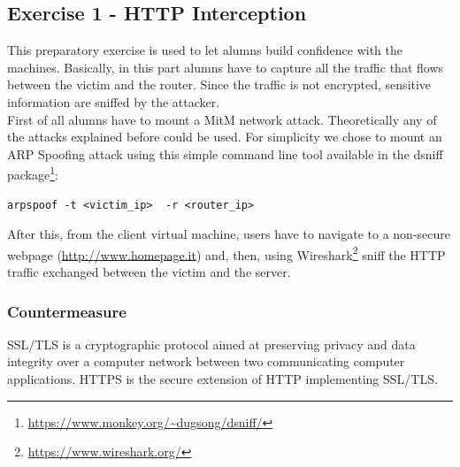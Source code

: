 \documentclass[final]{article}
\begin{document}
\subsection{Exercise 1 - HTTP Interception}
This preparatory exercise is used to let alumns build confidence with the machines.
Basically, in this part alumns have to capture all the traffic that flows between the victim and the router.
Since the traffic is not encrypted, sensitive information are sniffed by the attacker. \\
First of all alumns have to mount a \ac{MitM} network attack.
Theoretically any of the attacks explained before could be used.
For simplicity we chose to mount an ARP Spoofing attack using this simple command line tool available in the dsniff package\footnote{\url{https://www.monkey.org/~dugsong/dsniff/}}:
\begin{lstlisting}
arpspoof -t <victim_ip>  -r <router_ip>
\end{lstlisting}
After this, from the client virtual machine, users have to navigate to a non-secure webpage (\url{http://www.homepage.it})
and, then, using Wireshark\footnote{\url{https://www.wireshark.org/}} sniff the HTTP traffic exchanged between the victim and the server.
\subsubsection{Countermeasure}
SSL/TLS is a cryptographic protocol aimed at preserving privacy and data integrity over a computer network between two communicating computer applications.
HTTPS is the secure extension of HTTP implementing SSL/TLS.
\newpage
\end{document}
